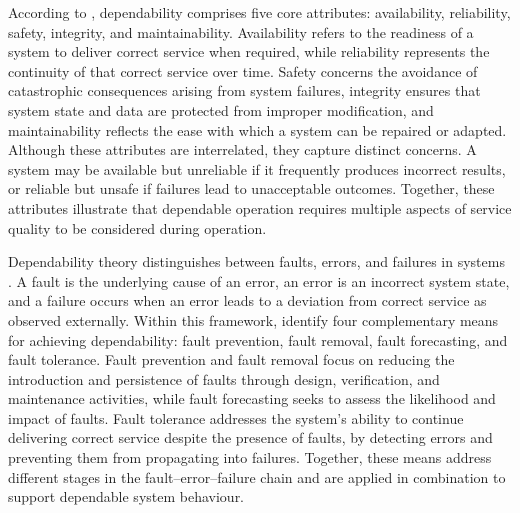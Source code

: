 According to \citet{avizienis2004basic}, dependability comprises five core attributes: availability, reliability, safety, integrity, and maintainability. Availability refers to the readiness of a system to deliver correct service when required, while reliability represents the continuity of that correct service over time. Safety concerns the avoidance of catastrophic consequences arising from system failures, integrity ensures that system state and data are protected from improper modification, and maintainability reflects the ease with which a system can be repaired or adapted. Although these attributes are interrelated, they capture distinct concerns. A system may be available but unreliable if it frequently produces incorrect results, or reliable but unsafe if failures lead to unacceptable outcomes. Together, these attributes illustrate that dependable operation requires multiple aspects of service quality to be considered during operation.

Dependability theory distinguishes between faults, errors, and failures in systems \cite{avizienis2004basic}. A fault is the underlying cause of an error, an error is an incorrect system state, and a failure occurs when an error leads to a deviation from correct service as observed externally. Within this framework, \citet{avizienis2004basic} identify four complementary means for achieving dependability: fault prevention, fault removal, fault forecasting, and fault tolerance. Fault prevention and fault removal focus on reducing the introduction and persistence of faults through design, verification, and maintenance activities, while fault forecasting seeks to assess the likelihood and impact of faults. Fault tolerance addresses the system’s ability to continue delivering correct service despite the presence of faults, by detecting errors and preventing them from propagating into failures. Together, these means address different stages in the fault--error--failure chain and are applied in combination to support dependable system behaviour.





























